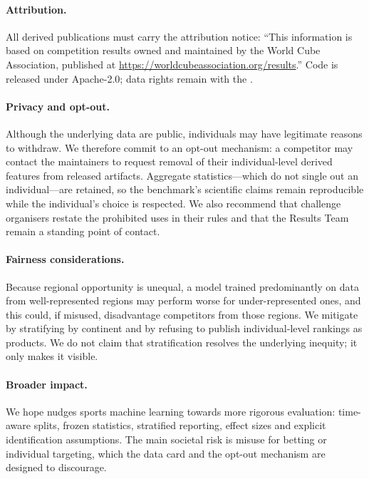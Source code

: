 \paragraph{Attribution.} All derived publications must carry the \wca{}
attribution notice: “This information is based on competition results owned and
maintained by the World Cube Association, published at
\url{https://worldcubeassociation.org/results}.” Code is released under
Apache-2.0; data rights remain with the \wca{}.

\paragraph{Privacy and opt-out.} Although the underlying data are public,
individuals may have legitimate reasons to withdraw. We therefore commit to an
opt-out mechanism: a competitor may contact the maintainers to request removal
of their individual-level derived features from released artifacts. Aggregate
statistics---which do not single out an individual---are retained, so the
benchmark's scientific claims remain reproducible while the individual's
choice is respected. We also recommend that challenge organisers restate the
prohibited uses in their rules and that the \wca{} Results Team remain a
standing point of contact.

\paragraph{Fairness considerations.} Because regional opportunity is unequal,
a model trained predominantly on data from well-represented regions may perform
worse for under-represented ones, and this could, if misused, disadvantage
competitors from those regions. We mitigate by stratifying by continent and by
refusing to publish individual-level rankings as products. We do not claim that
stratification resolves the underlying inequity; it only makes it visible.

\paragraph{Broader impact.} We hope \wcabench{} nudges sports machine learning
towards more rigorous evaluation: time-aware splits, frozen statistics,
stratified reporting, effect sizes and explicit identification assumptions.
The main societal risk is misuse for betting or individual targeting, which the
data card and the opt-out mechanism are designed to discourage.
